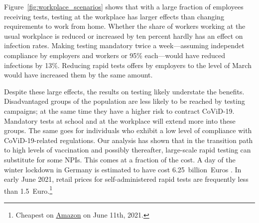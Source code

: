Figure~\ref{fig:workplace_scenarios} shows that with a large fraction of employees receiving tests, testing at the workplace has larger effects than changing requirements to work from home. Whether the share of workers working at the usual workplace is reduced or increased by ten percent hardly has an effect on infection rates. Making testing mandatory twice a week---assuming independet compliance by employers and workers or 95\% each---would have reduced infections by 13\%. Reducing rapid tests offers by employers to the level of March would have increased them by the same amount. 

Despite these large effects, the results on testing likely understate the benefits.
Disadvantaged groups of the population are less likely to be reached by testing
campaigns; at the same time they have a higher risk to contract
CoViD-19.\citet{KochInstitut2021a} Mandatory tests at school and at the workplace will
extend more into these groups. The same goes for individuals who exhibit a low level of
compliance with CoViD-19-related regulations. Our analysis has shown that in the
transition path to high levels of vaccination and possibly thereafter, large-scale rapid
testing can substitute for some NPIs. This comes at a fraction of the cost. A day of the
winter lockdown in Germany is estimated to have cost 6.25~billion~Euros
\citep{Dorn2020b}. In early June 2021, retail prices
for self-administered rapid tests are frequently less than 1.5~Euro.\footnote{Cheapest on
\href{https://amazon.de}{Amazon} on June 11th, 2021.}
